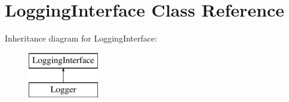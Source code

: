 \hypertarget{classLoggingInterface}{\section{Logging\-Interface Class Reference}
\label{classLoggingInterface}
}
Inheritance diagram for Logging\-Interface\-:\begin{figure}[H]
\begin{center}
\leavevmode
\includegraphics[height=2.000000cm]{classLoggingInterface}
\end{center}
\end{figure}
